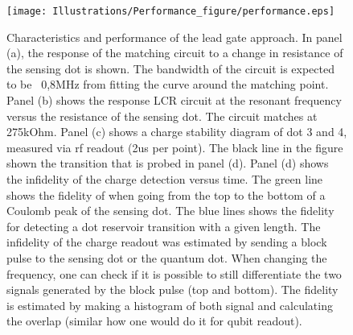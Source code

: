 \documentclass{article}
\begin{document}
\begin{figure}
	\texttt{[image: Illustrations/Performance\_figure/performance.eps]}
	\caption{Characteristics and performance of the lead gate approach. In panel (a), the response of the matching circuit to a change in resistance of the sensing dot is shown. The bandwidth of the circuit is expected to be ~0,8MHz from fitting the curve around the matching point.
	Panel (b) shows the response LCR circuit at the resonant frequency versus the resistance of the sensing dot. The circuit matches at 275kOhm.
	Panel (c) shows a charge stability diagram of dot 3 and 4, measured via rf readout (2us per point). The black line in the figure shown the transition that is probed in panel (d).
 	Panel (d) shows the infidelity of the charge detection versus time. The green line shows the fidelity of when going from the top to the bottom of a Coulomb peak of the sensing dot. The blue lines shows the fidelity for detecting a dot reservoir transition with a given length. The infidelity of the charge readout was estimated by sending a block pulse to the sensing dot or the quantum dot. When changing the frequency, one can check if it is possible to still differentiate the two signals generated by the block pulse (top and bottom). The fidelity is estimated by making a histogram of both signal and calculating the overlap (similar how one would do it for qubit readout).
	}
	\label{fig:lead_gate_result}
\end{figure}
	
\end{document}
